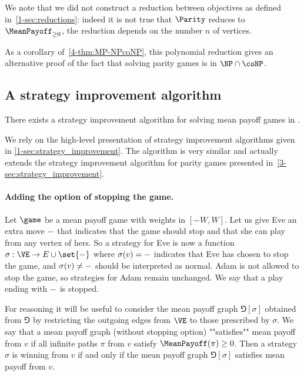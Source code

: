 We note that we did not construct a reduction between objectives as defined in~\cref{1-sec:reductions}:
indeed it is not true that $\Parity$ reduces to $\MeanPayoff_{\ge 0}$, the reduction depends on the number $n$ of vertices.

As a corollary of~\cref{4-thm:MP-NPcoNP}, this polynomial reduction gives an alternative proof of the fact
that solving parity games is in $\NP \cap \coNP$.

\subsection*{A strategy improvement algorithm}
\begin{theorem}
\label{4-thm:strategy_improvement}
There exists a strategy improvement algorithm for solving mean payoff games in .
\end{theorem}

We rely on the high-level presentation of strategy improvement algorithms given in \cref{1-sec:strategy_improvement}.
The algorithm is very similar and actually extends the strategy improvement algorithm for parity games presented in~\cref{3-sec:strategy_improvement}.

\paragraph{\bf Adding the option of stopping the game.}
Let $\game$ be a mean payoff game with weights in $[-W,W]$.
Let us give Eve an extra move $\mathtt{-}$ that indicates that the game should stop and that she can play from any vertex of hers.
So a strategy for Eve is now a function $\sigma : \VE \rightarrow E \cup \set{\siblank}$ 
where $\sigma(v) = \mathtt{-}$ indicates that Eve has chosen to stop the game, and $\sigma(v) \ne \mathtt{-}$ should be interpreted as normal.
Adam is not allowed to stop the game, so strategies for Adam remain unchanged.
We say that a play ending with $\mathtt{-}$ is stopped.

For reasoning it will be useful to consider the mean payoff graph $\Game[\sigma]$ obtained from $\Game$ by restricting the outgoing edges from $\VE$
to those prescribed by $\sigma$. 
We say that a mean payoff graph (without stopping option) ""satisfies"" mean payoff from $v$ if all infinite paths $\pi$ from $v$ satisfy 
$\MeanPayoff(\pi) \ge 0$.
Then a strategy $\sigma$ is winning from $v$ if and only if the mean payoff graph $\Game[\sigma]$ satisfies mean payoff from $v$.

